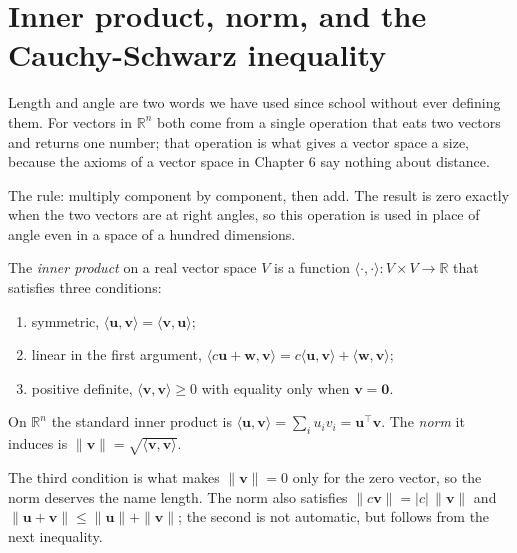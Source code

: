 \section{Inner product, norm, and the Cauchy-Schwarz inequality}

Length and angle are two words we have used since school without ever
defining them. For vectors in $\mathbb{R}^{n}$ both come from a single operation
that eats two vectors and returns one number; that operation is what gives a
vector space a size, because the axioms of a vector space in Chapter 6 say nothing about distance.

The rule: multiply component by component, then add. The result is zero exactly when the
two vectors are at right angles, so this operation is used in place of angle even
in a space of a hundred dimensions.


\begin{definisi}
The \emph{inner product} on a real vector space $V$ is a function
$\langle\cdot,\cdot\rangle\colon V\times V\to\mathbb{R}$ that satisfies three conditions:
\begin{enumerate}
  \item symmetric, $\langle\mathbf{u},\mathbf{v}\rangle=\langle\mathbf{v},\mathbf{u}\rangle$;
  \item linear in the first argument,
        $\langle c\mathbf{u}+\mathbf{w},\mathbf{v}\rangle
         =c\langle\mathbf{u},\mathbf{v}\rangle+\langle\mathbf{w},\mathbf{v}\rangle$;
  \item positive definite, $\langle\mathbf{v},\mathbf{v}\rangle\ge0$ with equality
        only when $\mathbf{v}=\mathbf{0}$.
\end{enumerate}
On $\mathbb{R}^{n}$ the standard inner product is
$\langle\mathbf{u},\mathbf{v}\rangle=\sum_{i}u_{i}v_{i}
=\mathbf{u}^{\top}\mathbf{v}$. The \emph{norm} it induces is
$\|\mathbf{v}\|=\sqrt{\langle\mathbf{v},\mathbf{v}\rangle}$.
\end{definisi}

The third condition is what makes $\|\mathbf{v}\|=0$ only for the zero vector, so the norm
deserves the name length. The norm also satisfies $\|c\mathbf{v}\|=|c|\,\|\mathbf{v}\|$ and
$\|\mathbf{u}+\mathbf{v}\|\le\|\mathbf{u}\|+\|\mathbf{v}\|$; the second is not automatic,
but follows from the next inequality.

